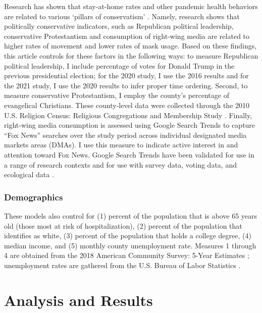 Research has shown that stay-at-home rates and other pandemic health behaviors
are related to various `pillars of conservatism'
\citep{gonzalez_etal21,hillBloodChristCompels2020,hillLoveThyAged2021,
hillNastiestQuestion}. Namely, research shows that politically conservative
indicators, such as Republican political leadership, conservative Protestantism
and consumption of right-wing media are related to higher rates of movement and
lower rates of mask usage. Based on these findings, this article controls for
these factors in the following ways: to measure Republican political leadership,
I include percentage of votes for Donald Trump in the previous presidential
election; for the 2020 study, I use the 2016 results and for the 2021 study, I
use the 2020 results to infer proper time ordering. Second, to measure
conservative Protestantism, I employ the county's percentage of evangelical
Christians. These county-level data were collected through the 2010 U.S.
Religion Census: Religious Congregations and Membership Study
\citep{grammich_etal18}. Finally, right-wing media consumption is assessed using
Google Search Trends to capture ``Fox News'' searches over the study period
across individual designated media markets areas (DMAs). I use this measure to
indicate active interest in and attention toward Fox News. Google Search Trends
have been validated for use in a range of research contexts and for use with
survey data, voting data, and ecological data
\citep{bailPrestigeProximityPrejudice2019, reyesUsingInternetSearch2018,
scheitleGoogleInsightsSearch2011, stephensdavidowitzCostRacialAnimus2014,
swearingenGoogleInsightsSenate2014}.

\hypertarget{demographics}{%
\subsubsection{Demographics}\label{demographics}}

These models also control for (1) percent of the population that is above 65
years old (those most at risk of hospitalization), (2) percent of the population
that identifies as white, (3) percent of the population that holds a college
degree, (4) median income, and (5) monthly county unemployment rate. Measures 1
through 4 are obtained from the 2018 American Community Survey: 5-Year Estimates
\citep{uscensusbureauAmericanCommunitySurvey2018}; unemployment rates are
gathered from the U.S. Bureau of Labor Statistics \citep{labor2020a}.

\hypertarget{analysis-and-results}{%
\section{Analysis and Results}\label{analysis-and-results}}

